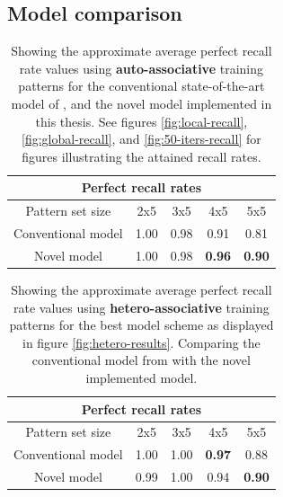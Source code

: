 \subsection{Model comparison}

\begin{table}[]
\centering
\caption{Showing the approximate average perfect recall rate values using \textbf{auto-associative} training patterns for the conventional state-of-the-art model of \citep{Hattori2014}, and the novel model implemented in this thesis. See figures \ref{fig:local-recall}, \ref{fig:global-recall}, and \ref{fig:50-iters-recall} for figures illustrating the attained recall rates.}
\label{table:comparison-perfect-recall-rates}
\begin{tabular}{|c|c|c|c|c|}
\hline
\multicolumn{5}{|c|}{Perfect recall rates}                                         \\ \hline
Pattern set size   & 2x5           & 3x5           & 4x5           & 5x5           \\ \hline
Conventional model & 1.00 & 0.98 & 0.91 & 0.81 \\ \hline
Novel model        & 1.00 & 0.98 & \textbf{0.96} & \textbf{0.90}  \\ \hline
\end{tabular}
\end{table}

\begin{table}[]
\centering
\caption{Showing the approximate average perfect recall rate values using \textbf{hetero-associative} training patterns for the best model scheme as displayed in figure \ref{fig:hetero-results}. Comparing the conventional model from \citep{Hattori2014} with the novel implemented model.}
\label{table:comparison-perfect-recall-rates-hetero}
\begin{tabular}{|c|c|c|c|c|}
\hline
\multicolumn{5}{|c|}{Perfect recall rates}                                         \\ \hline
Pattern set size   & 2x5           & 3x5           & 4x5           & 5x5           \\ \hline
Conventional model & 1.00 & 1.00 & \textbf{0.97} & 0.88 \\ \hline
Novel model        & 0.99 & 1.00 & 0.94 & \textbf{0.90}  \\ \hline
\end{tabular}
\end{table}


